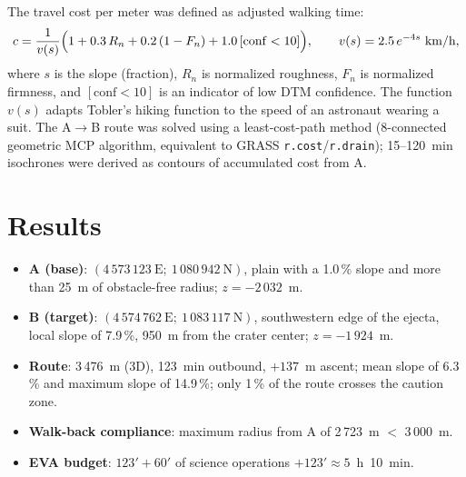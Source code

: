 \documentclass{article}
\begin{document}
The travel cost per meter was defined as adjusted walking time:
\begin{equation}
c = \frac{1}{v(s)}\Bigl(1 + 0.3\,R_n + 0.2\,(1-F_n) + 1.0\,[\mathrm{conf}<10]\Bigr),
\qquad v(s) = 2.5\,e^{-4s}~\text{km/h},
\label{eq:costo}
\end{equation}
where $s$ is the slope (fraction), $R_n$ is normalized roughness, $F_n$ is normalized firmness, and $[\mathrm{conf}<10]$ is an indicator of low DTM confidence. The function $v(s)$ adapts Tobler's hiking function \citep{tobler1993} to the speed of an astronaut wearing a suit. The A$\to$B route was solved using a least-cost-path method (8-connected geometric MCP algorithm, equivalent to GRASS \texttt{r.cost}/\texttt{r.drain}); 15--120~min isochrones were derived as contours of accumulated cost from A.

\newpage

\section{Results}

\begin{itemize}
    \item \textbf{A (base)}: $(4\,573\,123~\mathrm{E};\ 1\,080\,942~\mathrm{N})$, plain with a 1.0\,\% slope and more than 25~m of obstacle-free radius; $z = -2\,032$~m.
    \item \textbf{B (target)}: $(4\,574\,762~\mathrm{E};\ 1\,083\,117~\mathrm{N})$, southwestern edge of the ejecta, local slope of 7.9\,\%, 950~m from the crater center; $z = -1\,924$~m.
    \item \textbf{Route}: 3\,476~m (3D), 123~min outbound, $+137$~m ascent; mean slope of 6.3\,\% and maximum slope of 14.9\,\%; only 1\,\% of the route crosses the caution zone.
    \item \textbf{Walk-back compliance}: maximum radius from A of 2\,723~m $<$ 3\,000~m.
    \item \textbf{EVA budget}: $123' + 60'$ of science operations $+ 123' \approx 5$~h~10~min.
\end{itemize}
\end{document}
